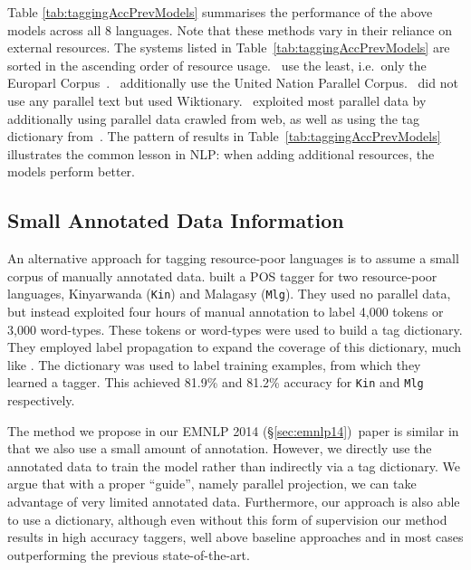\documentclass[12pt,twoside,final,hidelinks]{ltthesis}
\theoremstyle{definition}
\newcommand\emnlpiv{EMNLP 2014 (\S\ref{sec:emnlp14})}
\begin{document}
Table \ref{tab:taggingAccPrevModels} summarises the performance of the above models across all 8 languages. Note that these methods vary in their reliance on external resources. The systems listed in Table~\ref{tab:taggingAccPrevModels} are sorted in the ascending order of resource usage.~ use the least, i.e.\ only the Europarl Corpus~\cite{europarl}.~ additionally use the United Nation Parallel Corpus.~ did not use any parallel text but used Wiktionary.~ exploited most parallel data by additionally using parallel data crawled from web, as well as 
using the tag dictionary from~. The pattern of results in Table~\ref{tab:taggingAccPrevModels} illustrates the common lesson in NLP: when adding additional resources, the models perform better.  
 
\subsection{Small Annotated Data Information}

An alternative approach for tagging resource-poor languages is to assume a small corpus of manually annotated data.  built a POS tagger for two resource-poor languages, Kinyarwanda (\texttt{Kin}) and Malagasy (\texttt{Mlg}). They used no parallel data, but instead exploited four hours of manual annotation to label 4,000 tokens or 3,000 word-types. These tokens or word-types were used to build a tag dictionary. They employed label propagation to expand the coverage of this dictionary, much like . The dictionary was used to label training examples, from which they learned a tagger. This achieved 81.9\% and 81.2\% accuracy for \texttt{Kin} and \texttt{Mlg} respectively. %
 
The method we propose in our \emnlpiv\ paper is similar in that we also use a small amount of annotation. However, we directly use the annotated data to train the model rather than indirectly via a tag dictionary. We argue that with a proper ``guide'', namely parallel projection, we can take advantage of very limited annotated data. Furthermore, our approach is also able to use a dictionary, although even without this form of supervision our method results in high accuracy taggers, well above baseline approaches and in most cases outperforming the previous state-of-the-art.  
 
\end{document}
